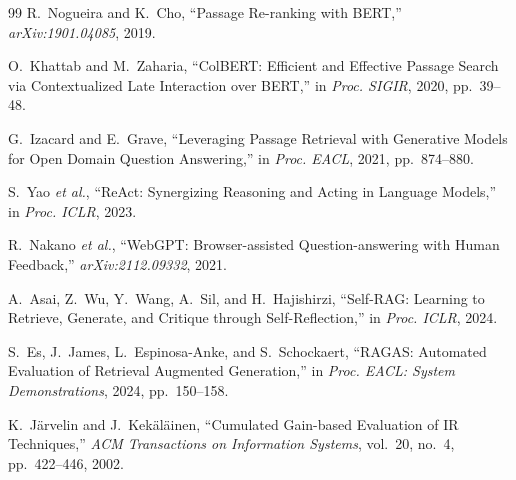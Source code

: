 \begin{frame}[allowframebreaks]{}
\begin{PTltr}
\begin{thebibliography}{99}
      R.~Nogueira and K.~Cho, ``Passage Re-ranking with BERT,''
      \textit{arXiv:1901.04085}, 2019.

      O.~Khattab and M.~Zaharia, ``ColBERT: Efficient and Effective Passage
      Search via Contextualized Late Interaction over BERT,'' in
      \textit{Proc. SIGIR}, 2020, pp.~39--48.

      \framebreak

      G.~Izacard and E.~Grave, ``Leveraging Passage Retrieval with Generative
      Models for Open Domain Question Answering,'' in \textit{Proc. EACL}, 2021,
      pp.~874--880.

      S.~Yao \textit{et al.}, ``ReAct: Synergizing Reasoning and Acting in
      Language Models,'' in \textit{Proc. ICLR}, 2023.

      R.~Nakano \textit{et al.}, ``WebGPT: Browser-assisted Question-answering
      with Human Feedback,'' \textit{arXiv:2112.09332}, 2021.

      A.~Asai, Z.~Wu, Y.~Wang, A.~Sil, and H.~Hajishirzi, ``Self-RAG: Learning
      to Retrieve, Generate, and Critique through Self-Reflection,'' in
      \textit{Proc. ICLR}, 2024.

      S.~Es, J.~James, L.~Espinosa-Anke, and S.~Schockaert, ``RAGAS: Automated
      Evaluation of Retrieval Augmented Generation,'' in \textit{Proc. EACL:
      System Demonstrations}, 2024, pp.~150--158.

      K.~J\"arvelin and J.~Kek\"al\"ainen, ``Cumulated Gain-based Evaluation of
      IR Techniques,'' \textit{ACM Transactions on Information Systems},
      vol.~20, no.~4, pp.~422--446, 2002.

    \end{thebibliography}
  \end{PTltr}
\end{frame}
